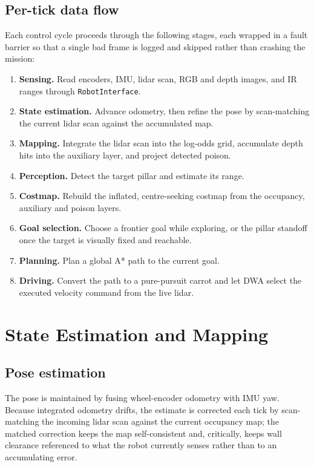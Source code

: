 \documentclass[11pt,a4paper]{article}
\newcommand{\code}[1]{\colorbox{codegray}{\texttt{\small #1}}}
\begin{document}
\subsection{Per-tick data flow}

Each control cycle proceeds through the following stages, each wrapped in a
fault barrier so that a single bad frame is logged and skipped rather than
crashing the mission:

\begin{enumerate}
\item \textbf{Sensing.} Read encoders, IMU, lidar scan, RGB and depth images,
and IR ranges through \code{RobotInterface}.
\item \textbf{State estimation.} Advance odometry, then refine the pose by
scan-matching the current lidar scan against the accumulated map.
\item \textbf{Mapping.} Integrate the lidar scan into the log-odds grid,
accumulate depth hits into the auxiliary layer, and project detected poison.
\item \textbf{Perception.} Detect the target pillar and estimate its range.
\item \textbf{Costmap.} Rebuild the inflated, centre-seeking costmap from the
occupancy, auxiliary and poison layers.
\item \textbf{Goal selection.} Choose a frontier goal while exploring, or the
pillar standoff once the target is visually fixed and reachable.
\item \textbf{Planning.} Plan a global A* path to the current goal.
\item \textbf{Driving.} Convert the path to a pure-pursuit carrot and let DWA
select the executed velocity command from the live lidar.
\end{enumerate}

\section{State Estimation and Mapping}

\subsection{Pose estimation}
The pose is maintained by fusing wheel-encoder odometry with IMU yaw. Because
integrated odometry drifts, the estimate is corrected each tick by
scan-matching the incoming lidar scan against the current occupancy map; the
matched correction keeps the map self-consistent and, critically, keeps wall
clearance referenced to what the robot currently senses rather than to an
accumulating error.
\end{document}
